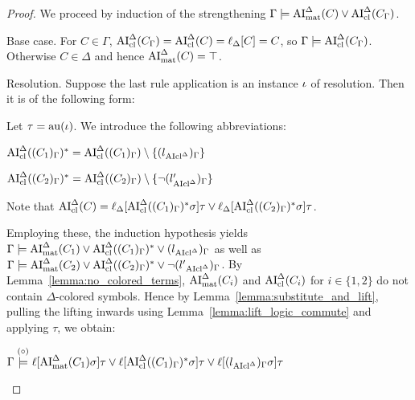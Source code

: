 \documentclass[,%
	draft=false,%
	numbers=noendperiod
	11pt,
	a4paper,
	oneside,%
	openany,
]{memoir}
\begin{document}
\begin{proof}
	We proceed by induction of the strengthening $\Gamma\models \operatorname{AI}_\mathrm{mat}^\Delta(C) \lor \operatorname{AI}_\mathrm{cl}^\Delta(C_\Gamma)$\footnotemark.

	\begin{description}
		\item{Base case.}
			For $C\in \Gamma$, $\operatorname{AI}_\mathrm{cl}^\Delta(C_\Gamma) = \operatorname{AI}_\mathrm{cl}^\Delta(C) = \ell_{\Delta}[C] = C$, so $\Gamma \models \operatorname{AI}_\mathrm{cl}^\Delta(C_\Gamma)$.
			Otherwise $C \in \Delta$ and hence $\operatorname{AI}_\mathrm{mat}^\Delta(C) = \top$.

		\item{Resolution.}
			Suppose the last rule application is an instance $\iota$ of resolution. Then it is of the following form:
			\begin{prooftree}
			\end{prooftree}

			Let
			$\tau = \operatorname{au}(\iota)$.
			We introduce the following abbreviations:

			\newcommand{\clauseOnePrime}{\AIclausede((C_1)_\Gamma)^*}
			\newcommand{\clauseTwoPrime}{\AIclausede((C_2)_\Gamma)^*}


			$ \clauseOnePrime = \AIclausede((C_1)_\Gamma) \setminus \{{(l{\fromclausede})_\Gamma}\}$

			$ \clauseTwoPrime = \AIclausede((C_2)_\Gamma)\setminus \{{\lnot (l{\fromclausede'})_\Gamma}\}$

			Note that $\AIclde(C) = \lifdeltanovar{ \clauseOnePrime\sigma} \tau \lor \lifdeltanovar{ \clauseTwoPrime\sigma} \tau$.

			Employing these, the induction hypothesis yields
			$\Gamma \entails \AImatrixde(C_1) \lor \clauseOnePrime \lor {(l{\fromclausede})_\Gamma}$
			as well as
			$\Gamma \entails \AImatrixde(C_2) \lor \clauseTwoPrime \lor {\lnot (l'{\fromclausede})_\Gamma}$.
			By Lemma~\ref{lemma:no_colored_terms}, $\operatorname{AI}_\mathrm{mat}^\Delta(C_i)$ and $\operatorname{AI}_\mathrm{cl}^\Delta(C_i)$ for $i\in\{1,2\}$ do not contain $\Delta$-colored symbols.
			Hence by Lemma~\ref{lemma:substitute_and_lift}, pulling the lifting inwards using Lemma~\ref{lemma:lift_logic_commute} and applying $\tau$, we obtain:

			$\Gamma \stackrel{\markA}\entails \lifboth{\AImatrixde(C_1)\sigma}\tau \lor \lifboth{\clauseOnePrime\sigma}\tau \lor \lifboth{(l{\fromclausede})_\Gamma\sigma}\tau$


\end{description}
\end{proof}
\end{document}
